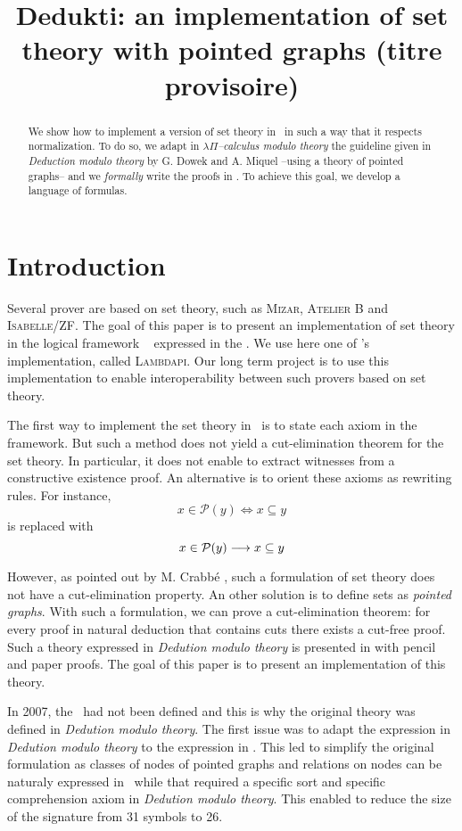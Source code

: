 \documentclass[a4paper]{article}
\title{\textbf{Dedukti: an implementation of set theory with pointed graphs} (titre provisoire)}
\date{}
\begin{document}
\thispagestyle{empty}
\maketitle

\begin{abstract}
We show how to implement a version of set theory in \dedukti ~in such a way that it respects normalization. To do so, we adapt in $\lambda \Pi$\textit{--calculus modulo theory} the guideline given in \textit{Deduction modulo theory} by G. Dowek and A. Miquel --using a theory of pointed graphs-- and we \textit{formally} write the proofs in \dedukti. To achieve this goal, we develop a language of formulas.
\end{abstract}

\section{Introduction}

Several prover are based on set theory, such as \textsc{Mizar}, \textsc{Atelier B} and \textsc{Isabelle/ZF}. The goal of this paper is to present an implementation of set theory in the logical framework \dedukti ~\cite{expressing} expressed in the \lpcm. We use here one of \dedukti's implementation, called \textsc{Lambdapi}. Our long term project is to use this implementation to enable interoperability between such provers based on set theory. 

The first way to implement the set theory in \dedukti ~is to state each axiom in the framework. But such a method does not yield a cut-elimination theorem for the set theory. In particular, it does not enable to extract witnesses from a constructive existence proof. An alternative is to orient these axioms as rewriting rules. For instance, $$x \in \mathcal{P}(y) \Leftrightarrow x \subseteq y$$ is replaced with $$x \in \mathcal{P}(y) \longrightarrow x \subseteq y$$

However, as pointed out by M. Crabbé \cite{crabbé}, such a formulation of set theory does not have a cut-elimination property. An other solution is to define sets as \textit{pointed graphs}. With such a formulation, we can prove a cut-elimination theorem: for every proof in natural deduction that contains cuts there exists a cut-free proof. Such a theory expressed in \textit{Dedution modulo theory} is presented in \cite{zermodulo} with pencil and paper proofs. The goal of this paper is to present an implementation of this theory.

In 2007, the \lpcm ~had not been defined and this is why the original theory was defined in \textit{Dedution modulo theory}. The first issue was to adapt the expression in \textit{Dedution modulo theory} to the expression in \lpcm. This led to simplify the original formulation as classes of nodes of pointed graphs and relations on nodes can be naturaly expressed in \dedukti ~while that required a specific sort and specific comprehension axiom in \textit{Dedution modulo theory}. This enabled to reduce the size of the signature from 31 symbols to 26.
\end{document}
